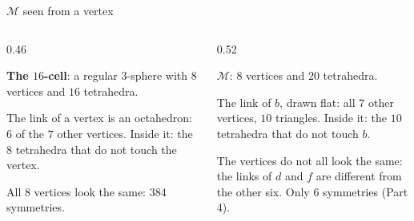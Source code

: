\begin{frame}{\(\mathcal M\) seen from a vertex}
\vspace{2mm}
\begin{columns}[t]
\begin{column}{0.46\textwidth}\centering
{}
\par\smallskip
\textbf{The \(16\)-cell}: a regular \(3\)-sphere with \(8\) vertices and \(16\) tetrahedra.
\par\smallskip
The link of a vertex is an octahedron: \(6\) of the \(7\) other vertices. Inside it: the \(8\) tetrahedra that do not touch the vertex.
\par\smallskip
All \(8\) vertices look the same: \(384\) symmetries.
\end{column}
\begin{column}{0.52\textwidth}\centering
{}
\par\smallskip
\textbf{\(\mathcal M\)}: \(8\) vertices and \(20\) tetrahedra.
\par\smallskip
The link of \(b\), drawn flat: all \(7\) other vertices, \(10\) triangles. Inside it: the \(10\) tetrahedra that do not touch \(b\).
\par\smallskip
The vertices do not all look the same: the links of \(d\) and \(f\) are different from the other six. Only \(6\) symmetries (Part 4).
\end{column}
\end{columns}
\end{frame}






